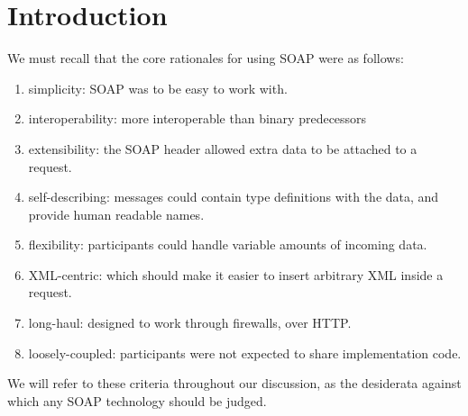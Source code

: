 \section{Introduction}
\label{intro:top}

We must recall that the core rationales for using SOAP were as
follows:
\begin{enumerate}
\item simplicity: SOAP was to be easy to work with.
\item interoperability: more interoperable than binary predecessors
\item extensibility: the SOAP header allowed extra data to be attached to a
request. 
\item self-describing: messages could contain type definitions with the
data, and provide human readable names.
\item flexibility: participants could handle variable amounts of
incoming data.
\item XML-centric: which should make it easier to insert arbitrary XML
inside a request.
\item long-haul: designed to work through firewalls, over HTTP.
\item loosely-coupled: participants were not expected to share
implementation code.
\end{enumerate}

We will refer to these criteria throughout our discussion, as the
desiderata against which any SOAP technology should be judged.



